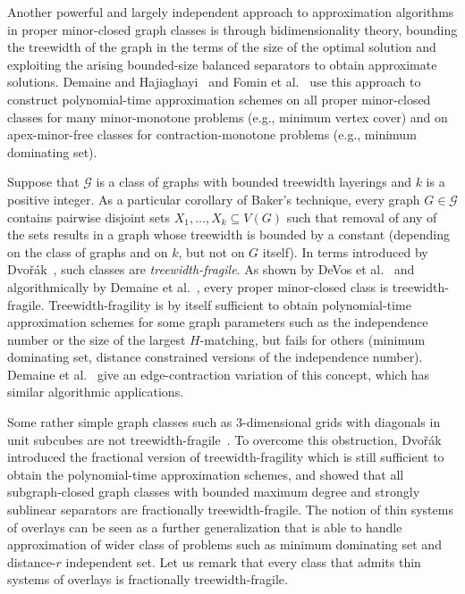 \documentclass[a4paper,11pt]{article}
\newcommand{\GG}{{\mathcal G}}
\begin{document}
Another powerful and largely independent approach to approximation algorithms in proper minor-closed graph classes
is through bidimensionality theory, bounding the treewidth of the graph in the terms of the size of the optimal solution
and exploiting the arising bounded-size balanced separators to obtain approximate solutions.
Demaine and Hajiaghayi~\cite{demaine2005bidimensionality} and Fomin et al.~\cite{fomin2011bidimensionality}
use this approach to construct polynomial-time approximation schemes on all proper minor-closed classes
for many minor-monotone problems (e.g., minimum vertex cover) and on apex-minor-free classes for contraction-monotone
problems (e.g., minimum dominating set).

Suppose that $\GG$ is a class of graphs with bounded treewidth layerings and $k$ is a positive integer.
As a particular corollary of Baker's technique, every graph $G\in\GG$ contains
pairwise disjoint sets $X_1,\ldots,X_k\subseteq V(G)$ such that removal of any of the sets results in a graph
whose treewidth is bounded by a constant (depending on the class of graphs and on $k$, but not on $G$ itself).
In terms introduced by Dvo\v{r}\'ak~\cite{twd}, such classes are \emph{treewidth-fragile}.  As shown by DeVos et al.~\cite{devospart}
and algorithmically by Demaine et al.~\cite{demaine2005algorithmic}, every proper minor-closed class is treewidth-fragile.
Treewidth-fragility is by itself sufficient to obtain polynomial-time approximation schemes for some graph parameters
such as the independence number or the size of the largest $H$-matching, but fails for others (minimum dominating set,
distance constrained versions of the independence number).  Demaine et al.~\cite{contrpart} give an edge-contraction
variation of this concept, which has similar algorithmic applications.

Some rather simple graph classes such as 3-dimensional
grids with diagonals in unit subcubes are not treewidth-fragile~\cite{gridtw}.  To overcome this obstruction,
Dvo\v{r}\'ak~\cite{twd} introduced the fractional version of treewidth-fragility which is still sufficient to obtain
the polynomial-time approximation schemes, and showed that all subgraph-closed graph classes with bounded maximum degree
and strongly sublinear separators are fractionally treewidth-fragile.  The notion of thin systems of overlays
can be seen as a further generalization that is able to handle approximation of wider class of problems such as minimum dominating set
and distance-$r$ independent set.  Let us remark that every class that admits thin systems of overlays is
fractionally treewidth-fragile.
\end{document}

